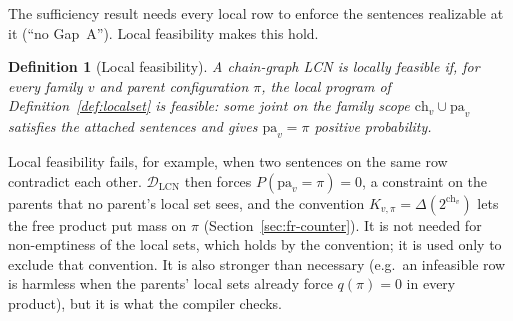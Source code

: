 \documentclass{article} %
\newtheorem{definition}{Definition}
\newcommand{\DLCN}{\mathcal{D}_{\mathrm{LCN}}}
\newcommand{\ch}{\mathrm{ch}}
\newcommand{\pa}{\mathrm{pa}}
\begin{document}
The sufficiency result needs every local row to enforce the sentences realizable at it
(``no Gap~A''). Local feasibility makes this hold.

\begin{definition}[Local feasibility]\label{def:lf}
A chain-graph LCN is \emph{locally feasible} if, for every family $v$ and parent configuration
$\pi$, the local program of Definition~\ref{def:localset} is feasible: some joint on the family scope
$\ch_v\cup\pa_v$ satisfies the attached sentences and gives $\pa_v{=}\pi$ positive probability.
\end{definition}

Local feasibility fails, for example, when two sentences on the same row contradict each other.
$\DLCN$ then forces $P(\pa_v{=}\pi)=0$, a constraint on the parents that no parent's local set
sees, and the convention $K_{v,\pi}=\Delta(2^{\ch_v})$ lets the free product put mass on $\pi$
(Section~\ref{sec:fr-counter}). It is not needed for non-emptiness of the local sets, which holds by
the convention; it is used only to exclude that convention. It is also stronger than necessary
(e.g.\ an infeasible row is harmless when the parents' local sets already force $q(\pi)=0$ in every
product), but it is what the compiler checks.
\end{document}
